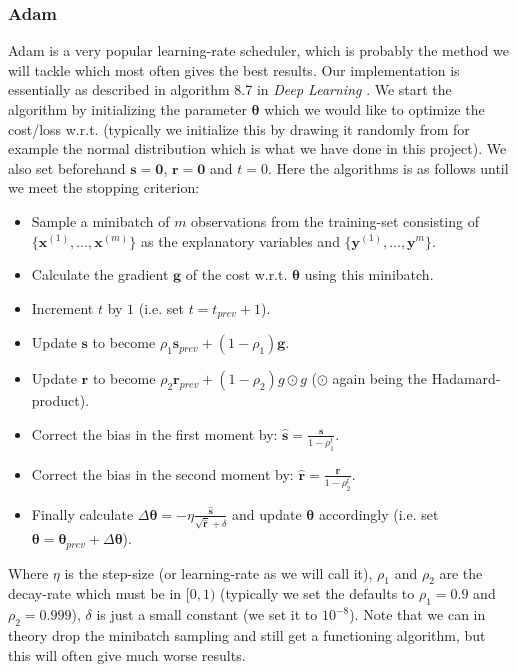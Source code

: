 \documentclass{article}
\begin{document}
\subsubsection{Adam}
Adam is a very popular learning-rate scheduler, which is probably the method we
will tackle which most often gives the best results. Our implementation is
essentially as described in algorithm 8.7 in \textit{Deep Learning}
\cite[s.~8.6.1]{goodfellow2016deep}. We start the algorithm by initializing the
parameter $\bm{\theta}$ which we would like to optimize the cost/loss w.r.t.
(typically we initialize this by drawing it randomly from for example the normal
distribution which is what we have done in this project). We also set beforehand
$\bm{s} = \bm{0}$, $\bm{r} = \bm{0}$ and $t=0$. Here the algorithms is as
follows until we meet the stopping criterion:
\begin{itemize}
    \item Sample a minibatch of $m$ observations from the training-set
          consisting of $\{\bm{x}^{(1)}, \dots, \bm{x}^{(m)}\}$ as the explanatory
          variables and $\{\bm{y}^{(1)}, \dots, \bm{y}^{m}\}$.
    \item Calculate the gradient $\bm{g}$ of the cost w.r.t. $\bm{\theta}$ using
          this minibatch.
    \item Increment $t$ by $1$ (i.e. set $t=t_{prev}+1$).
    \item Update $\bm{s}$ to become $\rho_1 \bm{s}_{prev} + (1 - \rho_1)\bm{g}$.
    \item Update $\bm{r}$ to become $\rho_2 \bm{r}_{prev} + (1 - \rho_2)g \odot
              g$ ($\odot$ again being the Hadamard-product).
    \item Correct the bias in the first moment by: $\hat{\bm{s}} = \frac{\bm{s}}{1 - \rho_1^t}$.
    \item Correct the bias in the second moment by: $\hat{\bm{r}} = \frac{\bm{r}}{1 - \rho_2^t}$.
    \item Finally calculate $\Delta \bm{\theta} = -\eta
              \frac{\hat{\bm{s}}}{\sqrt{\hat{\bm{r}}} + \delta}$ and update $\bm{\theta}$
          accordingly (i.e. set $\bm{\theta} = \bm{\theta}_{prev} + \Delta
              \bm{\theta}$).
\end{itemize}
Where $\eta$ is the step-size (or learning-rate as we will call it), $\rho_1$
and $\rho_2$ are the decay-rate which must be in $[0, 1)$ (typically we set the
defaults to $\rho_1 = 0.9$ and $\rho_2 = 0.999$), $\delta$ is just a small
constant (we set it to $10^{-8}$). Note that we can in theory drop the minibatch
sampling and still get a functioning algorithm, but this will often give much
worse results.
\end{document}
